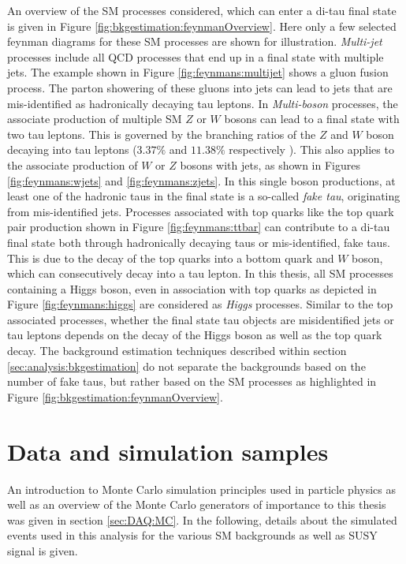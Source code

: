 An overview of the \ac{SM} processes considered,  which can enter a di-tau final state is given in Figure \ref{fig:bkgestimation:feynmanOverview}. Here only a few selected feynman diagrams for these \ac{SM} processes are shown for illustration.
\textit{Multi-jet} processes include all QCD processes that end up in a final state with multiple jets.  The example shown in Figure \ref{fig:feynmans:multijet} shows a gluon fusion process.  The parton showering of these gluons into jets can lead to jets that are mis-identified as hadronically decaying tau leptons.  In \textit{Multi-boson} processes,  the associate production of multiple \ac{SM} $Z$ or $W$ bosons can lead to a final state with two tau leptons.  This is governed by the branching ratios of the $Z$ and $W$ boson decaying into tau leptons ($3.37\%$  and $11.38\%$ respectively \cite{PDG2022}).  This also applies to the associate production of $W$ or $Z$ bosons with jets,  as shown in Figures \ref{fig:feynmans:wjets} and \ref{fig:feynmans:zjets}.  In this single boson productions, at least one of the hadronic taus in the final state is a so-called \textit{fake tau},  originating from mis-identified jets. 
Processes associated with top quarks like the top quark pair production shown in Figure \ref{fig:feynmans:ttbar} can contribute to a di-tau final state both through hadronically decaying taus or mis-identified, fake taus.  This is due to the decay of the top quarks into a bottom quark and $W$ boson,  which can consecutively decay into a tau lepton.
In this thesis,  all \ac{SM} processes containing a Higgs boson,  even in association with top quarks as depicted in Figure \ref{fig:feynmans:higgs} are considered as \textit{Higgs} processes.  Similar to the top associated processes,  whether the final state tau objects are misidentified jets or tau leptons depends on the decay of the Higgs boson as well as the top quark decay.  The background estimation techniques described within section \ref{sec:analysis:bkgestimation} do not separate the backgrounds based on the number of fake taus, but rather based on the \ac{SM} processes as highlighted in Figure \ref{fig:bkgestimation:feynmanOverview}.


\section{Data and simulation samples}
\label{sec:analysis:samples}
An introduction to Monte Carlo simulation principles used in particle physics as well as an overview of the Monte Carlo generators of importance to this thesis was given in section \ref{sec:DAQ:MC}.  In the following,  details about the simulated events used in this analysis for the various \ac{SM} backgrounds as well as \ac{SUSY} signal is given.

